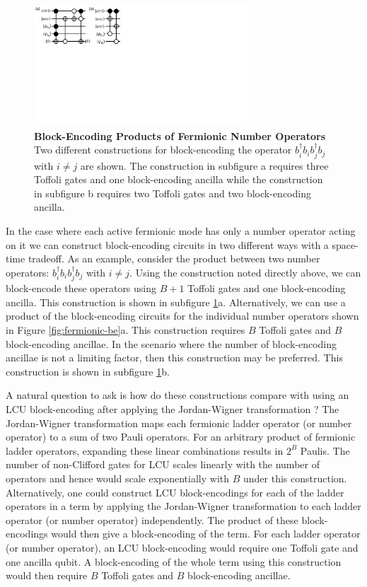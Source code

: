 \begin{figure}[h]
    \includegraphics[width=8cm]{figures/fermionic-number-op-be.pdf}
    \caption{
        \textbf{Block-Encoding Products of Fermionic Number Operators}
        Two different constructions for block-encoding the operator $b_i^\dagger b_i b_j^\dagger b_j$ with $i \neq j$ are shown.
        The construction in subfigure a requires three Toffoli gates and one block-encoding ancilla while the construction in subfigure b requires two Toffoli gates and two block-encoding ancilla.
    }
    \label{fig:fermionic-number-op-be}
\end{figure}


In the case where each active fermionic mode has only a number operator acting on it we can construct block-encoding circuits in two different ways with a space-time tradeoff.
As an example, consider the product between two number operators: $b_i^\dagger b_i b_j^\dagger b_j$ with $i \neq j$.
Using the construction noted directly above, we can block-encode these operators using $B + 1$ Toffoli gates and one block-encoding ancilla.
This construction is shown in subfigure \ref{fig:fermionic-number-op-be}a.
Alternatively, we can use a product of the block-encoding circuits for the individual number operators shown in Figure \ref{fig:fermionic-be}a.
This construction requires $B$ Toffoli gates and $B$ block-encoding ancillae.
In the scenario where the number of block-encoding ancillae is not a limiting factor, then this construction may be preferred.
This construction is shown in subfigure \ref{fig:fermionic-number-op-be}b.

A natural question to ask is how do these constructions compare with using an LCU block-encoding after applying the Jordan-Wigner transformation \cite{}?
The Jordan-Wigner transformation maps each fermionic ladder operator (or number operator) to a sum of two Pauli operators.
For an arbitrary product of fermionic ladder operators, expanding these linear combinations results in $2^{B}$ Paulis.
The number of non-Clifford gates for LCU scales linearly with the number of operators and hence would scale exponentially with $B$ under this construction.
Alternatively, one could construct LCU block-encodings for each of the ladder operators in a term by applying the Jordan-Wigner transformation to each ladder operator (or number operator) independently.
The product of these block-encodings would then give a block-encoding of the term.
For each ladder operator (or number operator), an LCU block-encoding would require one Toffoli gate and one ancilla qubit.
A block-encoding of the whole term using this construction would then require $B$ Toffoli gates and $B$ block-encoding ancillae.


